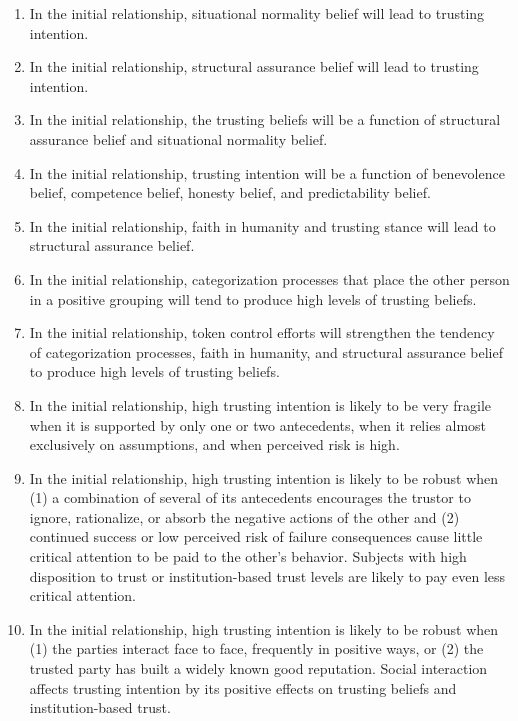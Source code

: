 \documentclass[10pt]{article}
\begin{document}
\begin{enumerate}
\item In the initial relationship, situational normality belief will lead to trusting intention.
\item In the initial relationship, structural assurance belief will lead to trusting intention.
\item In the initial relationship, the trusting beliefs will be a function of structural assurance belief and situational normality belief.
\item In the initial relationship, trusting intention will be a function of benevolence belief, competence belief, honesty belief, and predictability belief.
\item In the initial relationship, faith in humanity and trusting stance will lead to structural assurance belief.
\item In the initial relationship, categorization processes that place the other person in a positive grouping will tend to produce high levels of trusting beliefs.
\item In the initial relationship, token control efforts will strengthen the tendency of categorization processes, faith in humanity, and structural assurance belief to produce high levels of trusting beliefs.
\item In the initial relationship, high trusting intention is likely to be very fragile when it is supported
by only one or two antecedents, when it relies almost exclusively on assumptions, and when perceived risk is high.
\item In the initial relationship, high trusting intention is likely to be robust when (1) a combination of several of its antecedents encourages the trustor to ignore, rationalize, or absorb the negative actions of the other and (2) continued success or low perceived risk of failure consequences cause little critical attention to be paid to the other's behavior. Subjects with high disposition to trust or institution-based trust levels are likely to pay even less critical attention.
\item In the initial relationship, high trusting intention is likely to be robust when (1) the parties interact face to face, frequently in positive ways, or (2) the trusted party has built a widely known good reputation. Social interaction affects trusting intention by its positive effects on trusting beliefs and institution-based trust.

\end{enumerate}
\cite{mcknight1998initial}

\balance{}


\end{document}
